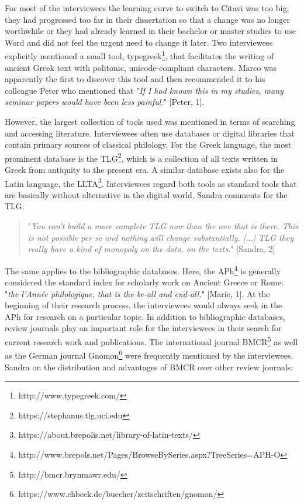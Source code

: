 \documentclass[12pt, a4paper, titlepage, oneside, abstract=true, toc=listof, toc=bibliography, BCOR=1cm]{scrreprt}
\begin{document}
For most of the interviewees the learning curve to switch to Citavi was too big, they had progressed too far in their dissertation so that a change was no longer worthwhile or they had already learned in their bachelor or master studies to use Word and did not feel the urgent need to change it later. 
Two interviewees explicitly mentioned a small tool, typegreek\footnote{http://www.typegreek.com/}, that facilitates the writing of ancient Greek text with politonic, unicode-compliant characters. Marco was apparently the first to discover this tool and then recommended it to his colleague Peter who mentioned that "\textit{If I had known this in my studies, many seminar papers would have been less painful.}" [Peter, 1].

However, the largest collection of tools used was mentioned in terms of searching and accessing literature. Interviewees often use databases or digital libraries that contain primary sources of classical philology. 
For the Greek language, the most prominent database is the \gls{TLG}\footnote{https://stephanus.tlg.uci.edu}, which is a collection of all texts written in Greek from antiquity to the present era. A similar database exists also for the Latin language, the \gls{LLTA}\footnote{https://about.brepolis.net/library-of-latin-texts/}. Interviewees regard both tools as standard tools that are basically without alternative in the digital world. Sandra comments for the \gls{TLG}: 

\begin{quotation}
"\textit{You can't build a more complete TLG now than the one that is there. This is not possible per se and nothing will change substantially. [...] TLG they really have a kind of monopoly on the data, on the texts.}" [Sandra, 2]
\end{quotation}

The same applies to the bibliographic databases. Here, the \gls{APh}\footnote{http://www.brepols.net/Pages/BrowseBySeries.aspx?TreeSeries=APH-O} is generally considered the standard index for scholarly work on Ancient Greece or Rome: "\textit{the l'Année philologique, that is the be-all and end-all.}" [Marie, 1]. At the beginning of their research process, the interviewees would always seek in the APh for research on a particular topic. 
In addition to bibliographic databases, review journals play an important role for the interviewees in their search for current research work and publications. The international journal \gls{BMCR}\footnote{http://bmcr.brynmawr.edu/} as well as the German journal \gls{Gnomon}\footnote{https://www.chbeck.de/buecher/zeitschriften/gnomon/} were frequently mentioned by the interviewees. Sandra on the distribution and advantages of BMCR over other review journals: 
\end{document}
